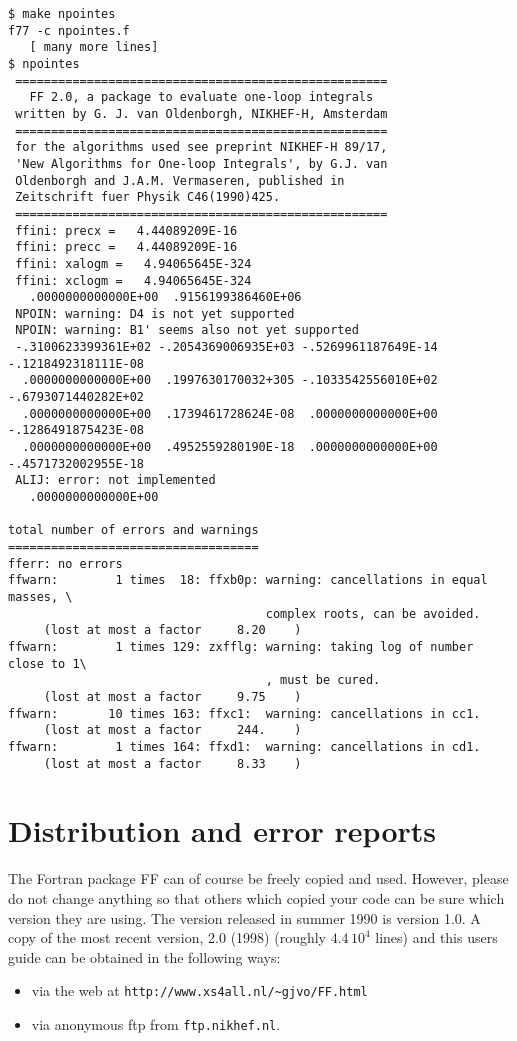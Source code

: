 {\small
\begin{verbatim}
$ make npointes
f77 -c npointes.f
   [ many more lines]
$ npointes
 ====================================================
   FF 2.0, a package to evaluate one-loop integrals
 written by G. J. van Oldenborgh, NIKHEF-H, Amsterdam
 ====================================================
 for the algorithms used see preprint NIKHEF-H 89/17,
 'New Algorithms for One-loop Integrals', by G.J. van
 Oldenborgh and J.A.M. Vermaseren, published in 
 Zeitschrift fuer Physik C46(1990)425.
 ====================================================
 ffini: precx =   4.44089209E-16
 ffini: precc =   4.44089209E-16
 ffini: xalogm =   4.94065645E-324
 ffini: xclogm =   4.94065645E-324
   .0000000000000E+00  .9156199386460E+06
 NPOIN: warning: D4 is not yet supported
 NPOIN: warning: B1' seems also not yet supported
 -.3100623399361E+02 -.2054369006935E+03 -.5269961187649E-14 -.1218492318111E-08
  .0000000000000E+00  .1997630170032+305 -.1033542556010E+02 -.6793071440282E+02
  .0000000000000E+00  .1739461728624E-08  .0000000000000E+00 -.1286491875423E-08
  .0000000000000E+00  .4952559280190E-18  .0000000000000E+00 -.4571732002955E-18
 ALIJ: error: not implemented
   .0000000000000E+00
 
total number of errors and warnings
===================================
fferr: no errors
ffwarn:        1 times  18: ffxb0p: warning: cancellations in equal masses, \
                                    complex roots, can be avoided.  
     (lost at most a factor     8.20    )
ffwarn:        1 times 129: zxfflg: warning: taking log of number close to 1\
                                    , must be cured.
     (lost at most a factor     9.75    )
ffwarn:       10 times 163: ffxc1:  warning: cancellations in cc1.                                          
     (lost at most a factor     244.    )
ffwarn:        1 times 164: ffxd1:  warning: cancellations in cd1.                                          
     (lost at most a factor     8.33    )
\end{verbatim}
}


\section{Distribution and error reports}

The Fortran package FF can of course be freely copied and used.  However, 
please do not change anything so that others which copied your code can be 
sure which version they are using.  The version released in summer 
1990 is version 1.0.  A copy of the most recent version, 2.0 (1998)
(roughly $4.4\,10^4$ lines) and this users guide can be obtained in 
the following ways:
\begin{itemize}
\item via the web at \verb+http://www.xs4all.nl/~gjvo/FF.html+
\item via anonymous ftp from {\tt ftp.nikhef.nl}.
\end{itemize}

